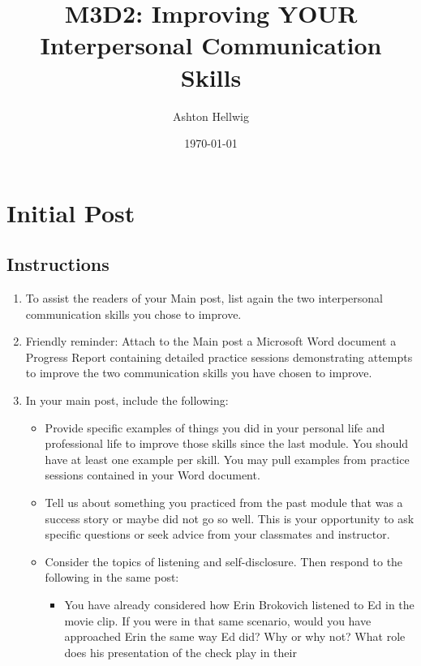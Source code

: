 \documentclass[stu,12pt]{apa7}
\title{%
    M3D2: Improving YOUR Interpersonal Communication Skills
  }
\author{Ashton Hellwig}
\date{\today}
\begin{document}
  \maketitle

  \section{Initial Post}
    \subsection*{Instructions}
      \begin{enumerate}
        \item To assist the readers of your Main post, list again the two
          interpersonal communication skills you chose to improve.
        \item Friendly reminder: Attach to the Main post a Microsoft Word
          document a Progress Report containing detailed practice sessions
          demonstrating attempts to improve the two communication skills you
          have chosen to improve.
        \item In your main post, include the following:
          \begin{itemize}
            \item Provide specific examples of things you did in your personal
              life and professional life to improve those skills since the last
              module. You should have at least one example per skill. You may
              pull examples from practice sessions contained in your Word
              document.
            \item Tell us about something you practiced from the past module
              that was a success story or maybe did not go so well. This is
              your opportunity to ask specific questions or seek advice from
              your classmates and instructor.
            \item Consider the topics of listening and self-disclosure. Then
              respond to the following in the same post:
              \begin{itemize}
                \item You have already considered how Erin Brokovich listened to
                  Ed in the movie clip. If you were in that same scenario, would
                  you have approached Erin the same way Ed did? Why or why not?
                  What role does his presentation of the check play in their

\end{itemize}
\end{itemize}
\end{enumerate}
\end{document}
